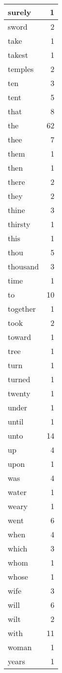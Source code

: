 \begin{center}
\begin{longtable}{l|r}
surely & 1\\ \hline 
sword & 2\\ \hline 
take & 1\\ \hline 
takest & 1\\ \hline 
temples & 2\\ \hline 
ten & 3\\ \hline 
tent & 5\\ \hline 
that & 8\\ \hline 
the & 62\\ \hline 
thee & 7\\ \hline 
them & 1\\ \hline 
then & 1\\ \hline 
there & 2\\ \hline 
they & 2\\ \hline 
thine & 3\\ \hline 
thirsty & 1\\ \hline 
this & 1\\ \hline 
thou & 5\\ \hline 
thousand & 3\\ \hline 
time & 1\\ \hline 
to & 10\\ \hline 
together & 1\\ \hline 
took & 2\\ \hline 
toward & 1\\ \hline 
tree & 1\\ \hline 
turn & 1\\ \hline 
turned & 1\\ \hline 
twenty & 1\\ \hline 
under & 1\\ \hline 
until & 1\\ \hline 
unto & 14\\ \hline 
up & 4\\ \hline 
upon & 1\\ \hline 
was & 4\\ \hline 
water & 1\\ \hline 
weary & 1\\ \hline 
went & 6\\ \hline 
when & 4\\ \hline 
which & 3\\ \hline 
whom & 1\\ \hline 
whose & 1\\ \hline 
wife & 3\\ \hline 
will & 6\\ \hline 
wilt & 2\\ \hline 
with & 11\\ \hline 
woman & 1\\ \hline 
years & 1\\ \hline 
\end{longtable}
\end{center}



